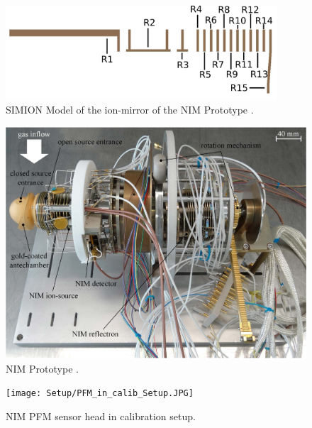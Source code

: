 		\begin{figure}[h]
			\centering
			\includegraphics[width=0.9\textwidth]{Setup/Prototype_Reflectron_sim.png}
			\caption{SIMION Model of the ion-mirror of the NIM Prototype \cite{Diss_Meyer}.}
			\label{fig:SetupProtoReflSim}
		\end{figure}
		
		\begin{figure}[h] %
			\centering
			\includegraphics[width=\textwidth]{Setup/Prototype_totPic.jpg}
			\caption{NIM Prototype \cite{Diss_Meyer}.}
			\label{fig:SetupProto}
		\end{figure}
		
		\begin{figure}[h] %
			\centering
			\texttt{[image: Setup/PFM\_in\_calib\_Setup.JPG]}
			\caption{NIM PFM sensor head in calibration setup.}
			\label{fig:SetupPFM}
		\end{figure}
		
